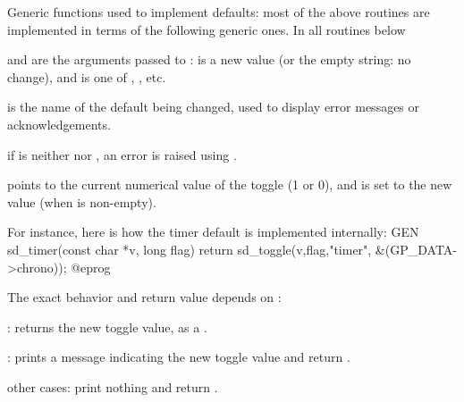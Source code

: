







\noindent Generic functions used to implement defaults: most of the above
routines are implemented in terms of the following generic ones. In all
routines below

\item {} and  are the arguments passed to  :
 is a new value (or the empty string: no change), and  is one
of , , etc.

\item {} is the name of the default being changed, used to display error
messages or acknowledgements.


\item if  is neither  nor , an error is raised using
.

\item {} points to the current numerical value of the toggle (1 or 0),
and is set to the new value (when  is non-empty).

For instance, here is how the timer default is implemented internally:
\bprog
GEN
sd_timer(const char *v, long flag)
{ return sd_toggle(v,flag,"timer", &(GP_DATA->chrono)); }
@eprog

The exact behavior and return value depends on :

\item {}: returns the new toggle value, as a .

\item {}: prints a message indicating the new toggle value
and return .

\item other cases: print nothing and return .


